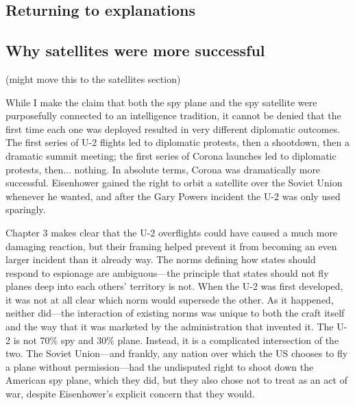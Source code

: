 \documentclass{memoir}
\begin{document}
\subsection{Returning to explanations}



\subsection{Why satellites were more successful}
(might move this to the satellites section)

While I make the claim that both the spy plane and the spy satellite were purposefully connected to an intelligence tradition, it cannot be denied that the first time each one was deployed resulted in very different diplomatic outcomes. The first series of U-2 flights led to diplomatic protests, then a shootdown, then a dramatic summit meeting; the first series of Corona launches led to diplomatic protests, then... nothing. In absolute terms, Corona was dramatically more successful. Eisenhower gained the right to orbit a satellite over the Soviet Union whenever he wanted, and after the Gary Powers incident the U-2 was only used sparingly.

Chapter 3 makes clear that the U-2 overflights could have caused a much more damaging reaction, but their framing helped prevent it from becoming an even larger incident than it already way. The norms defining how states should respond to espionage are ambiguous---the principle that states should not fly planes deep into each others' territory is not. When the U-2 was first developed, it was not at all clear which norm would supersede the other. As it happened, neither did---the interaction of existing norms was unique to both the craft itself and the way that it was marketed by the administration that invented it. The U-2 is not 70\% spy and 30\% plane. Instead, it is a complicated intersection of the two. The Soviet Union---and frankly, any nation over which the US chooses to fly a plane without permission---had the undisputed right to shoot down the American spy plane, which they did, but they also chose not to treat as an act of war, despite Eisenhower's explicit concern that they would.
\end{document}
